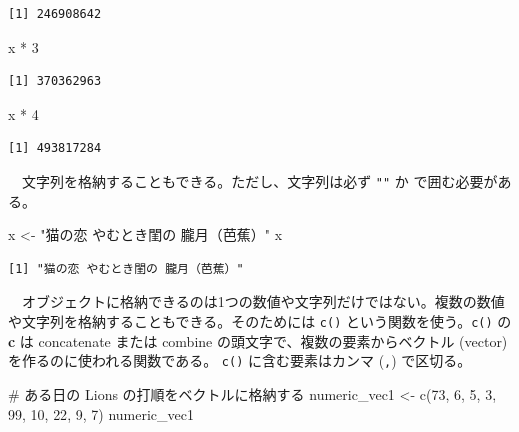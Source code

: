 \documentclass[
  a4paper,
  pandoc,
  ja=standard,
  jafont=haranoaji]{bxjsbook}
\newenvironment{Shaded}{\begin{snugshade}}{\end{snugshade}}
\newcommand{\CommentTok}[1]{\textcolor[rgb]{0.37,0.37,0.37}{#1}}
\newcommand{\DecValTok}[1]{\textcolor[rgb]{0.68,0.00,0.00}{#1}}
\newcommand{\FunctionTok}[1]{\textcolor[rgb]{0.28,0.35,0.67}{#1}}
\newcommand{\NormalTok}[1]{\textcolor[rgb]{0.00,0.48,0.65}{#1}}
\newcommand{\OtherTok}[1]{\textcolor[rgb]{0.00,0.48,0.65}{#1}}
\newcommand{\SpecialCharTok}[1]{\textcolor[rgb]{0.37,0.37,0.37}{#1}}
\newcommand{\StringTok}[1]{\textcolor[rgb]{0.13,0.47,0.30}{#1}}
\begin{document}
\begin{verbatim}
[1] 246908642
\end{verbatim}

\begin{Shaded}
\begin{Highlighting}[numbers=left,,]
\NormalTok{x }\SpecialCharTok{*} \DecValTok{3}
\end{Highlighting}
\end{Shaded}

\begin{verbatim}
[1] 370362963
\end{verbatim}

\begin{Shaded}
\begin{Highlighting}[numbers=left,,]
\NormalTok{x }\SpecialCharTok{*} \DecValTok{4}
\end{Highlighting}
\end{Shaded}

\begin{verbatim}
[1] 493817284
\end{verbatim}

　文字列を格納することもできる。ただし、文字列は必ず \texttt{""} か
\texttt{\textquotesingle{}\textquotesingle{}} で囲む必要がある。

\begin{Shaded}
\begin{Highlighting}[numbers=left,,]
\NormalTok{x }\OtherTok{\textless{}{-}} \StringTok{"猫の恋 やむとき閨の 朧月（芭蕉）"}
\NormalTok{x}
\end{Highlighting}
\end{Shaded}

\begin{verbatim}
[1] "猫の恋 やむとき閨の 朧月（芭蕉）"
\end{verbatim}

　オブジェクトに格納できるのは1つの数値や文字列だけではない。複数の数値や文字列を格納することもできる。そのためには
\texttt{c()} という関数を使う。\texttt{c()} の\textbf{c} は concatenate
または combine の頭文字で、複数の要素からベクトル (vector)
を作るのに使われる関数である。 \texttt{c()} に含む要素はカンマ
(\texttt{,}) で区切る。

\begin{Shaded}
\begin{Highlighting}[numbers=left,,]
\CommentTok{\# ある日の Lions の打順をベクトルに格納する}
\NormalTok{numeric\_vec1  }\OtherTok{\textless{}{-}} \FunctionTok{c}\NormalTok{(}\DecValTok{73}\NormalTok{, }\DecValTok{6}\NormalTok{, }\DecValTok{5}\NormalTok{, }\DecValTok{3}\NormalTok{, }\DecValTok{99}\NormalTok{, }\DecValTok{10}\NormalTok{, }\DecValTok{22}\NormalTok{, }\DecValTok{9}\NormalTok{, }\DecValTok{7}\NormalTok{)}
\NormalTok{numeric\_vec1}
\end{Highlighting}
\end{Shaded}
\end{document}
